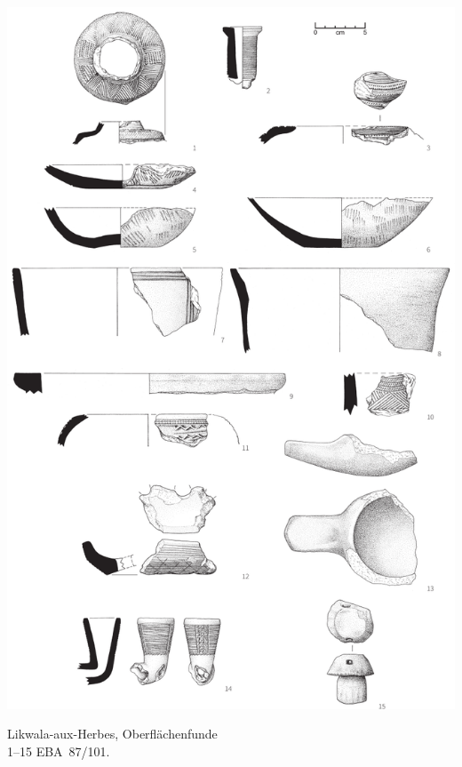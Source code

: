 \begin{pl}[H]
	\includegraphics{plt/Taf83.pdf}
	\vspace{.75em}\caption{Likwala-aux-Herbes, Oberflächenfunde \\ 1--15 EBA~87/101.}
	\label{pl:83}
\end{pl}

